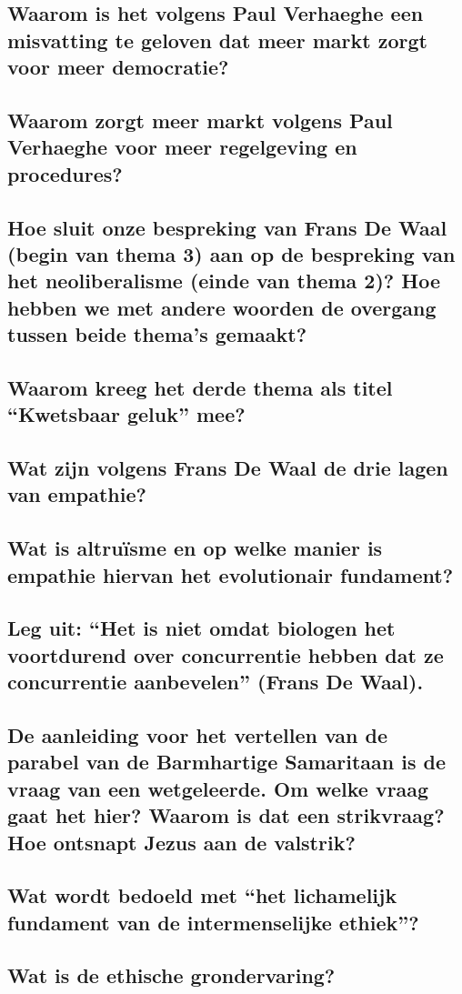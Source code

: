\documentclass[main.tex]{subfiles}
\begin{document}
\subsection{Waarom is het volgens Paul Verhaeghe een misvatting te geloven dat meer markt zorgt voor meer democratie?}
\subsection{Waarom zorgt meer markt volgens Paul Verhaeghe voor meer regelgeving en procedures?}
\subsection{Hoe sluit onze bespreking van Frans De Waal (begin van thema 3) aan op de bespreking van het neoliberalisme (einde van thema 2)? Hoe hebben we met andere woorden de overgang tussen beide thema’s gemaakt?}
\subsection{Waarom kreeg het derde thema als titel “Kwetsbaar geluk” mee?}
\subsection{Wat zijn volgens Frans De Waal de drie lagen van empathie?}
\subsection{Wat is altruïsme en op welke manier is empathie hiervan het evolutionair fundament?}
\subsection{Leg uit: “Het is niet omdat biologen het voortdurend over concurrentie hebben dat ze concurrentie aanbevelen” (Frans De Waal).}
\subsection{De aanleiding voor het vertellen van de parabel van de Barmhartige Samaritaan is de vraag van een wetgeleerde. Om welke vraag gaat het hier? Waarom is dat een strikvraag? Hoe ontsnapt Jezus aan de valstrik?}
\subsection{Wat wordt bedoeld met “het lichamelijk fundament van de intermenselijke ethiek”?}
\subsection{Wat is de ethische grondervaring?}
\end{document}
